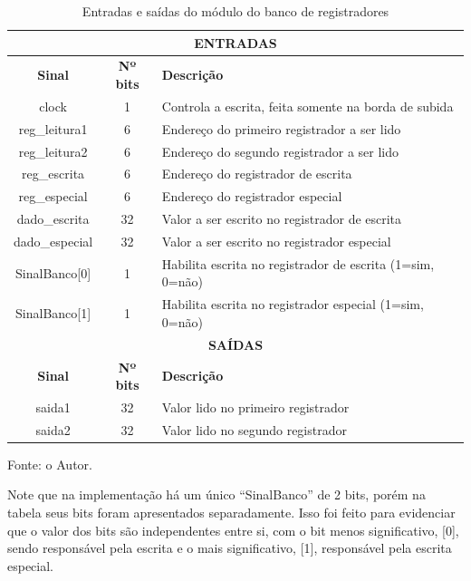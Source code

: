 \documentclass[
	12pt,				%
	oneside,
	a4paper,			%
	english,			%
	french,				%
	spanish,			%
	brazil,				%
	]{abntex2}
\begin{document}
\setlength{\tabcolsep}{10pt} %
\begin{table}[H]
\centering
\caption{Entradas e saídas do módulo do banco de registradores}
\label{tab:IO-banco_registradores}
\begin{tabular}{|c|c|l|}
\hline
\multicolumn{3}{|c|}{\textbf{ENTRADAS}} \\
\hline
\textbf{Sinal} & \textbf{Nº bits} & \textbf{Descrição} \\
\hline
clock & 1 & Controla a escrita, feita somente na borda de subida \\
\hline
reg\_leitura1 & 6 & Endereço do primeiro registrador a ser lido \\
\hline
reg\_leitura2 & 6 & Endereço do segundo registrador a ser lido \\
\hline
reg\_escrita & 6 & Endereço do registrador de escrita \\
\hline
reg\_especial & 6 & Endereço do registrador especial \\
\hline
dado\_escrita & 32 & Valor a ser escrito no registrador de escrita \\
\hline
dado\_especial & 32 & Valor a ser escrito no registrador especial \\
\hline
SinalBanco[0] & 1 & Habilita escrita no registrador de escrita (1=sim, 0=não) \\
\hline
SinalBanco[1] & 1 & Habilita escrita no registrador especial (1=sim, 0=não) \\
\hline
\multicolumn{3}{|c|}{\textbf{SAÍDAS}} \\
\hline
\textbf{Sinal} & \textbf{Nº bits} & \textbf{Descrição} \\
\hline
saida1 & 32 & Valor lido no primeiro registrador \\
\hline
saida2 & 32 & Valor lido no segundo registrador \\
\hline
\end{tabular}
\vspace{-0.5em}
\begin{center}
Fonte: o Autor.
\end{center}
\end{table}

Note que na implementação há um único ``SinalBanco'' de 2 bits, porém na tabela seus bits foram apresentados separadamente. Isso foi feito para evidenciar que o valor dos bits são independentes entre si, com o bit menos significativo, [0], sendo responsável pela escrita e o mais significativo, [1], responsável pela escrita especial.
\end{document}
